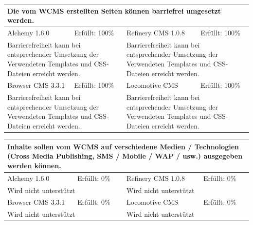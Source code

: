 \newline
\newline
\newline
\begin{tabular}[!ht]{|l|l|l|l|}
\hline
\multicolumn{4}{|p{15cm}|}{\textbf{Die vom WCMS erstellten Seiten können barriefrei umgesetzt werden.}} \\
\hline
  Alchemy 1.6.0 & \cellcolor{green}Erfüllt: 100\% & Refinery CMS 1.0.8 & \cellcolor{green}Erfüllt: 100\% \\
  \hline
  \multicolumn{2}{|p{7.5cm}|}{Barrierefreiheit kann bei entsprechender Umsetzung der Verwendeten Templates und CSS-Dateien erreicht werden.} & \multicolumn{2}{p{7.5cm}|}{Barrierefreiheit kann bei entsprechender Umsetzung der Verwendeten Templates und CSS-Dateien erreicht werden.} \\
  \hline
  Browser CMS 3.3.1 & \cellcolor{green}Erfüllt: 100\% & Locomotive CMS & \cellcolor{green}Erfüllt: 100\% \\
  \hline
  \multicolumn{2}{|p{7.5cm}|}{Barrierefreiheit kann bei entsprechender Umsetzung der Verwendeten Templates und CSS-Dateien erreicht werden.} & \multicolumn{2}{p{7.5cm}|}{Barrierefreiheit kann bei entsprechender Umsetzung der Verwendeten Templates und CSS-Dateien erreicht werden.} \\
\hline
\end{tabular}
\newline
\newline
\newline
\begin{tabular}[!ht]{|l|l|l|l|}
\hline
\multicolumn{4}{|p{15cm}|}{\textbf{Inhalte sollen vom WCMS auf verschiedene Medien / Technologien (Cross Media Publishing, SMS / Mobile / WAP / usw.) ausgegeben werden können.}} \\
\hline
  Alchemy 1.6.0 & \cellcolor{red}Erfüllt: 0\% & Refinery CMS 1.0.8 & \cellcolor{red}Erfüllt: 0\% \\
  \hline
  \multicolumn{2}{|p{7.5cm}|}{Wird nicht unterstützt} & \multicolumn{2}{p{7.5cm}|}{Wird nicht unterstützt} \\
  \hline
  Browser CMS 3.3.1 & \cellcolor{red}Erfüllt: 0\% & Locomotive CMS & \cellcolor{red}Erfüllt: 0\% \\
  \hline
  \multicolumn{2}{|p{7.5cm}|}{Wird nicht unterstützt} & \multicolumn{2}{p{7.5cm}|}{Wird nicht unterstützt} \\
\hline
\end{tabular}
\newline
\newline
